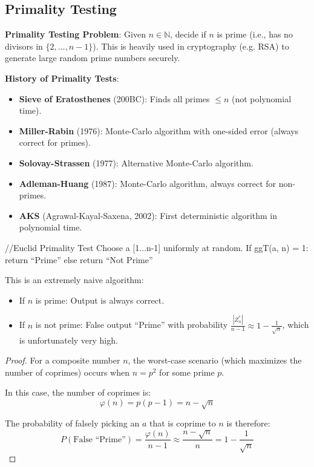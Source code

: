 \subsection{Primality Testing}

\begin{definition}
	\textbf{Primality Testing Problem}: Given $n \in \mathbb{N}$, decide if $n$ is prime (i.e., has no divisors in $\{2, \dots, n-1\}$).
	This is heavily used in cryptography (e.g. RSA) to generate large random prime numbers securely.
\end{definition}

\begin{remark}
	\textbf{History of Primality Tests}:
	\begin{itemize}
		\item \textbf{Sieve of Eratosthenes} (200BC): Finds all primes $\leq n$ (not polynomial time).
		\item \textbf{Miller-Rabin} (1976): Monte-Carlo algorithm with one-sided error (always correct for primes).
		\item \textbf{Solovay-Strassen} (1977): Alternative Monte-Carlo algorithm.
		\item \textbf{Adleman-Huang} (1987): Monte-Carlo algorithm, always correct for non-primes.
		\item \textbf{AKS} (Agrawal-Kayal-Saxena, 2002): First deterministic algorithm in polynomial time.
	\end{itemize}
\end{remark}

\begin{algorithm}
	//Euclid Primality Test
	Choose a [1...n-1] uniformly at random.
	If ggT(a, n) = 1:
	return ``Prime''
	else
	return ``Not Prime''
\end{algorithm}

\begin{remark}
	This is an extremely naive algorithm:
	\begin{itemize}
		\item If $n$ is prime: Output is always correct.
		\item If $n$ is not prime: False output ``Prime'' with probability $\frac{|Z_n^*|}{n-1} \approx 1 - \frac{1}{\sqrt{n}}$, which is unfortunately very high.
	\end{itemize}
\end{remark}

\begin{proof}
	For a composite number $n$, the worst-case scenario (which maximizes the number of coprimes) occurs when $n = p^2$ for some prime $p$.

	In this case, the number of coprimes is:
	$$ \varphi(n) = p(p-1) = n - \sqrt{n} $$

	The probability of falsely picking an $a$ that is coprime to $n$ is therefore:
	$$ P(\text{False ``Prime''}) = \frac{\varphi(n)}{n-1} \approx \frac{n - \sqrt{n}}{n} = 1 - \frac{1}{\sqrt{n}} $$
\end{proof}

